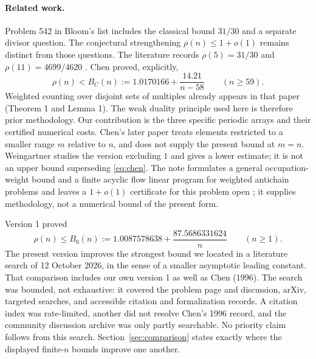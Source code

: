 \documentclass[10pt]{article}
\theoremstyle{remark}
\begin{document}
\paragraph{Related work.}
Problem 542 in Bloom's list \cite{EP542} includes the classical bound
$31/30$ and a separate divisor question. The conjectural strengthening
$\rho(n)\le1+o(1)$ remains distinct from those questions. The literature
records $\rho(5)=31/30$ and $\rho(11)=4699/4620$ \cite{Ch96,We}.
Chen \cite[Theorem 2, p.~104]{Ch96} proved, explicitly,
\begin{equation}\label{eq:chen}
 \rho(n)<B_C(n):=1.0170166+\frac{14.21}{n-58}\qquad(n\ge59).
\end{equation}
Weighted counting over disjoint sets of multiples already appears in
that paper (Theorem 1 and Lemma 1). The weak duality principle used here
is therefore prior methodology. Our contribution is the three specific
periodic arrays and their certified numerical costs. Chen's later
paper \cite[Theorem 1]{Ch97} treats elements restricted to a smaller
range $m$ relative to $n$, and does not supply the present bound at
$m=n$. Weingartner \cite[Theorem 3 and Question 1]{We} studies the
version excluding $1$ and gives a lower estimate; it is not an upper
bound superseding \eqref{eq:chen}. The note \cite[Theorem 2.3, Corollary 2.6,
Proposition 2.7]{SM} formulates a general occupation-weight bound and a
finite acyclic flow linear program for weighted antichain problems and
leaves a $1+o(1)$ certificate for this problem open \cite[Question 5.1]{SM};
it supplies methodology, not a numerical bound of the present form.

Version 1 \cite{V1} proved
\begin{equation}\label{eq:v1}
 \rho(n)\le B_0(n):=1.0087578638+\frac{87.5686331624}{n}
 \qquad(n\ge1).
\end{equation}
The present version improves the strongest bound we located in a
literature search of 12 October 2026, in the sense of a smaller
asymptotic leading constant. That comparison includes our own
version 1 as well as Chen (1996). The search was bounded, not exhaustive:
it covered the problem page and discussion, arXiv, targeted searches,
and accessible citation and formalization records. A citation index
was rate-limited, another did not resolve Chen's 1996 record, and the
community discussion archive was only partly searchable. No priority
claim follows from this search. Section~\ref{sec:comparison} states
exactly where the displayed finite-$n$ bounds improve one another.
\end{document}
